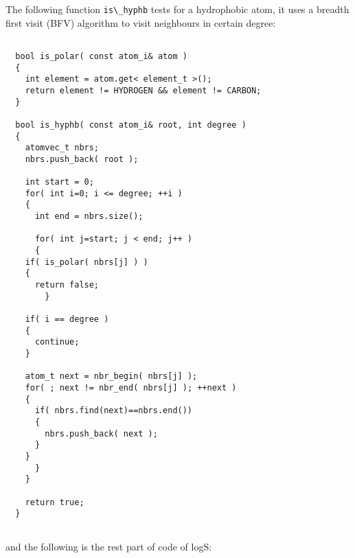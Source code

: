 \documentclass[letterpaper]{book}
\begin{document}
  The following function \lstinline$is\_hyphb$ tests for a hydrophobic atom, it uses a breadth first 
visit (BFV) algorithm to visit neighbours in certain degree:

\begin{lstlisting}

  bool is_polar( const atom_i& atom )
  {
    int element = atom.get< element_t >();
    return element != HYDROGEN && element != CARBON;
  }

  bool is_hyphb( const atom_i& root, int degree )
  {
    atomvec_t nbrs;
    nbrs.push_back( root );

    int start = 0;
    for( int i=0; i <= degree; ++i )
    {	    
      int end = nbrs.size();

      for( int j=start; j < end; j++ )
      {
	if( is_polar( nbrs[j] ) )
	{
	  return false;
        }

	if( i == degree )
	{
	  continue;
	}

	atom_t next = nbr_begin( nbrs[j] );
	for( ; next != nbr_end( nbrs[j] ); ++next )
	{
	  if( nbrs.find(next)==nbrs.end())
	  {
	    nbrs.push_back( next );
	  }
	}
      }
    }

    return true;
  }
  
\end{lstlisting}


and the following is the rest part of code of logS:
\end{document}
